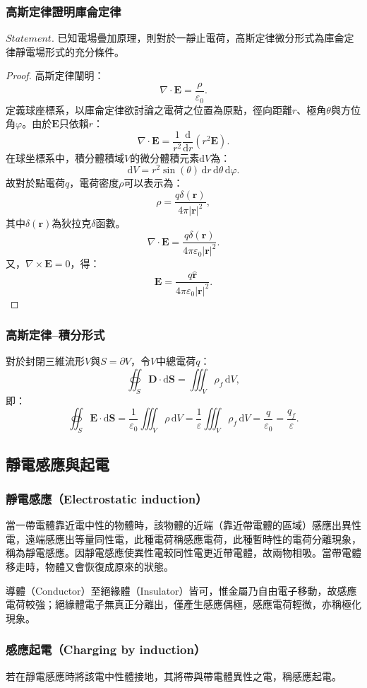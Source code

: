 \documentclass[a4paper,12pt]{report}
\begin{document}
\begin{itemize}
\subsubsection{高斯定律證明庫侖定律}
\(\textit{Statement.}\) 已知電場疊加原理，則對於一靜止電荷，高斯定律微分形式為庫侖定律靜電場形式的充分條件。
\begin{proof}
高斯定律闡明：
\[\nabla\cdot\mathbf{E}=\frac{\rho}{\varepsilon_0}.\]
定義球座標系，以庫侖定律欲討論之電荷之位置為原點，徑向距離$r$、極角$\theta$與方位角$\varphi$。由於$\mathbf{E}$只依賴$r$：
\[\nabla\cdot\mathbf{E}=\frac{1}{r^2}\frac{\mathrm{d}}{\mathrm{d} r}\left(r^2\mathbf{E}\right).\]
在球坐標系中，積分體積域$V$的微分體積元素$\mathrm{d}V$為：
\[\mathrm{d}V=r^2\sin(\theta)\,\mathrm{d}r\,\mathrm{d}\theta\,\mathrm{d}\varphi.\]
故對於點電荷$q$，電荷密度$\rho$可以表示為：
\[\rho=\frac{q\delta(\mathbf{r})}{4\pi|\mathbf{r}|^2},\]
其中$\delta(\mathbf{r})$為狄拉克$\delta$函數。
\[\nabla\cdot\mathbf{E}=\frac{q\delta(\mathbf{r})}{4\pi\varepsilon_0|\mathbf{r}|^2}.\]
又，$\nabla\times\mathbf{E}=0$，得：
\[\mathbf{E}=\frac{q\hat{\mathbf{r}}}{4\pi\varepsilon_0|\mathbf{r}|^2}.\]
\end{proof}
\subsubsection{高斯定律–積分形式}
對於封閉三維流形$V$與$S=\partial V$，令$V$中總電荷$q$：
\[\oiint_S\mathbf{D}\cdot\mathrm{d}\mathbf{S}=\iiint_V\rho_f\,\mathrm{d}V,\]
即：
\[\oiint_{S}\mathbf {E} \cdot \mathrm{d}\mathbf{S}=\frac{1}{\varepsilon_0}\iiint_V\rho\,\mathrm{d}V=\frac{1}{\varepsilon}\iiint_V\rho_f\,\mathrm{d}V=\frac{q}{\varepsilon_0}=\frac{q_f}{\varepsilon}.\]
\subsection{靜電感應與起電}
\subsubsection{靜電感應（Electrostatic induction）}
當一帶電體靠近電中性的物體時，該物體的近端（靠近帶電體的區域）感應出異性電，遠端感應出等量同性電，此種電荷稱感應電荷，此種暫時性的電荷分離現象，稱為靜電感應。因靜電感應使異性電較同性電更近帶電體，故兩物相吸。當帶電體移走時，物體又會恢復成原來的狀態。

導體（Conductor）至絕緣體（Insulator）皆可，惟金屬乃自由電子移動，故感應電荷較強；絕緣體電子無真正分離出，僅產生感應偶極，感應電荷輕微，亦稱極化現象。
\subsubsection{感應起電（Charging by induction）}
若在靜電感應時將該電中性體接地，其將帶與帶電體異性之電，稱感應起電。

\end{itemize}
\end{document}
